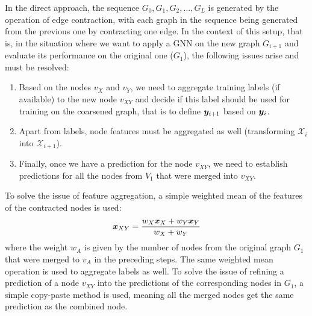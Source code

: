 In the direct approach, the sequence \( G_0, G_1, G_2, \dots, G_L \) is generated by the operation of edge contraction, with each graph in the sequence being generated from the previous one by contracting one edge. In the context of this setup, that is, in the situation where we want to apply a GNN on the new graph $G_{i+1}$ and evaluate its performance on the original one ($G_1$), the following issues arise and must be resolved:

\begin{enumerate}
    \item Based on the nodes $v_{X}$ and $v_{Y}$, we need to aggregate training labels (if available) to the new node $v_{XY}$ and decide if this label should be used for training on the coarsened graph, that is to define $\bm{y}_{i+1}$ based on $\bm{y}_i$.
    \item Apart from labels, node features must be aggregated as well (transforming $\mathcal{X}_i$ into $\mathcal{X}_{i+1}$).
    \item Finally, once we have a prediction for the node $v_{XY}$, we need to establish predictions for all the nodes from $V_1$ that were merged into $v_{XY}$.
\end{enumerate}

To solve the issue of feature aggregation, a simple weighted mean of the features of the contracted nodes is used:
\begin{equation}
	\bm{x}_{XY} = \frac{w_X \bm{x}_X+w_Y \bm{x}_Y}{w_X + w_Y}
\end{equation}
where the weight $w_A$ is given by the number of nodes from the original graph $G_1$ that were merged to $v_A$ in the preceding steps. The same weighted mean operation is used to aggregate labels as well. To solve the issue of refining a prediction of a node \( v_{XY} \) into the predictions of the corresponding nodes in \( G_1 \), a simple copy-paste method is used, meaning all the merged nodes get the same prediction as the combined node.

